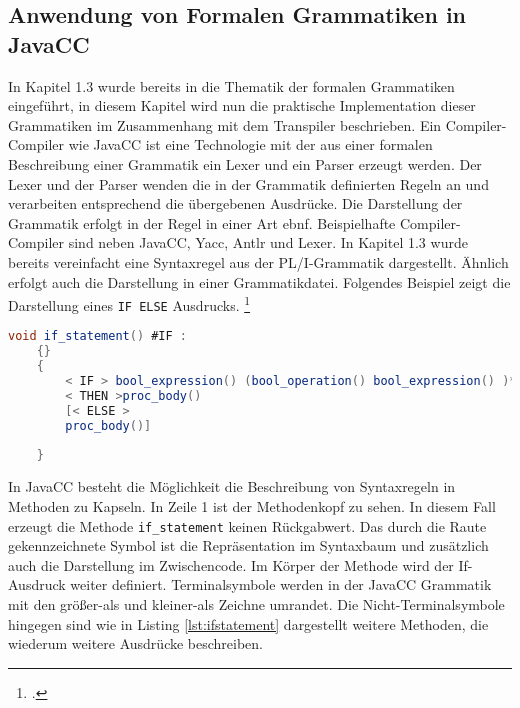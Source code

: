      
\pagebreak
\subsection{Anwendung von Formalen Grammatiken in JavaCC}

In Kapitel 1.3 wurde bereits in die Thematik der formalen Grammatiken eingeführt, in diesem Kapitel wird nun die praktische Implementation dieser Grammatiken im Zusammenhang mit dem Transpiler beschrieben.
Ein Compiler-Compiler wie JavaCC ist eine Technologie mit der aus einer formalen Beschreibung einer Grammatik ein Lexer und ein Parser erzeugt werden. 
Der Lexer und der Parser wenden die in der Grammatik definierten Regeln an und verarbeiten entsprechend die übergebenen Ausdrücke.
Die Darstellung der Grammatik erfolgt in der Regel in einer Art \ac{ebnf}. 
Beispielhafte Compiler-Compiler sind neben JavaCC, Yacc, Antlr und Lexer.
In Kapitel 1.3 wurde bereits vereinfacht eine Syntaxregel aus der PL/I-Grammatik dargestellt. Ähnlich erfolgt auch die Darstellung in einer Grammatikdatei. Folgendes Beispiel zeigt die Darstellung eines \verb+IF ELSE+ Ausdrucks. 
\footcite[Vgl. ][]{javaccdoku}


\begin{lstlisting}[language=Java, caption=If Statement aus der Grammatikdatei, label={lst:ifstatement}]
	void if_statement() #IF :
	{}
	{
		< IF > bool_expression() (bool_operation() bool_expression() )*
		< THEN >proc_body()
		[< ELSE >
		proc_body()]
		
	}
\end{lstlisting}

In JavaCC besteht die Möglichkeit die Beschreibung von Syntaxregeln in Methoden zu Kapseln.
In Zeile 1 ist der Methodenkopf zu sehen. In diesem Fall erzeugt die Methode \verb+if_statement+ keinen Rückgabwert.
Das durch die Raute gekennzeichnete Symbol ist die Repräsentation im Syntaxbaum und zusätzlich auch die Darstellung im Zwischencode.
Im Körper der Methode wird der If-Ausdruck weiter definiert. Terminalsymbole werden in der JavaCC Grammatik mit den größer-als und kleiner-als Zeichne umrandet. Die Nicht-Terminalsymbole hingegen sind wie in Listing \ref{lst:ifstatement} dargestellt weitere Methoden, die wiederum weitere Ausdrücke beschreiben.

